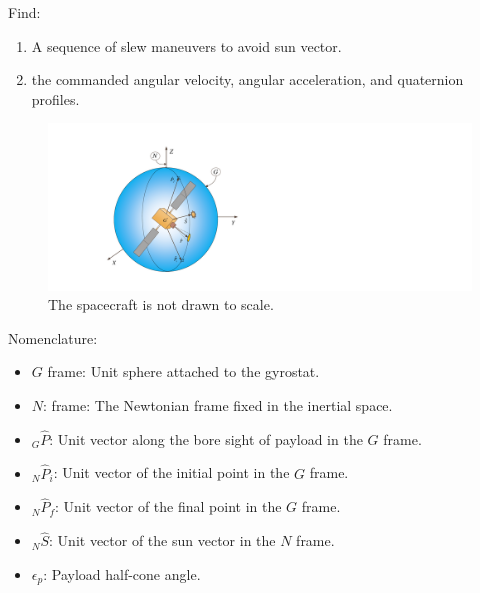 \documentclass[letterpaper, preprint, paper,11pt]{AAS}	%
\begin{document}
		Find: 
		\begin{enumerate}
			\item A sequence of slew maneuvers to avoid sun vector.
			\item the commanded angular velocity, angular acceleration, and quaternion profiles.
		\end{enumerate} 
		\begin{figure}[htb]
			\begin{center}
			\includegraphics[width=6in]{./Figures/SAS_Schematic}
			\caption{The spacecraft is not drawn to scale.}
			\end{center}
		\end{figure}
	
	
		Nomenclature: 
		\begin{itemize}
			\item $G$ frame: Unit sphere attached to the gyrostat.
			\item $N$: frame: The Newtonian frame fixed in the inertial space.
			\item $_G\hat{P}$: Unit vector along the bore sight of payload in the $G$ frame.
			\item $_N\hat{P}_i$: Unit vector of the initial point in the $G$ frame.
			\item $_N\hat{P}_f$: Unit vector of the final point in the $G$ frame.
			\item $_N\hat{S}$: Unit vector of the sun vector in the $N$ frame.
			\item $\epsilon_p$: Payload half-cone angle.
		\end{itemize}
	
\end{document}

